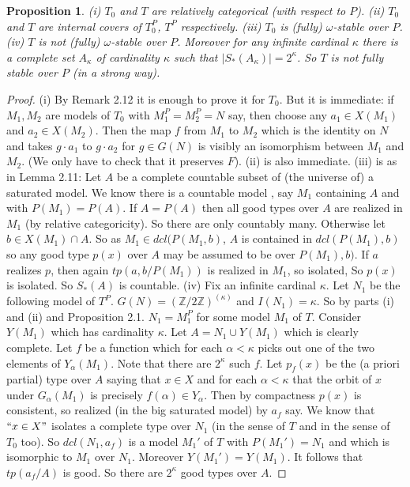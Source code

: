 \documentclass[12pt]{article}
\newtheorem{Proposition}[Theorem]{Proposition}
\newcommand{\Z}{\mathbb Z}  \newcommand{\Zz}{\mathbb Z}
\begin{document}
\begin{Proposition} (i) $T_{0}$ and $T$ are relatively categorical (with respect to $P$).
\newline
(ii) $T_{0}$ and $T$ are internal covers of $T_{0}^{P}$, $T^{P}$ respectively.
\newline
(iii) $T_{0}$ is (fully) $\omega$-stable over $P$.
\newline
(iv) $T$ is not (fully) $\omega$-stable over $P$. Moreover for any infinite cardinal $\kappa$ there is a complete set $A_{\kappa}$ of cardinality $\kappa$ such that  $|S_{*}(A_{\kappa})| = 2^{\kappa}$.  So $T$ is not fully stable over $P$ (in a strong way).  
\end{Proposition} 
\begin{proof} (i) By Remark 2.12 it is enough  to prove it for $T_{0}$. But it is immediate: if $M_{1}, M_{2}$ are models of $T_{0}$ with $M_{1}^{P} = M_{2}^{P} = N$ say, then choose any $a_{1}\in X(M_{1})$ and $a_{2}\in X(M_{2})$. Then 
the map $f$ from $M_{1}$ to $M_{2}$ which is the identity on $N$ and takes $g\cdot a_{1}$ to $g\cdot a_{2}$ for $g\in G(N)$ is visibly an isomorphism between $M_{1}$ and $M_{2}$.  (We only have to check that it preserves $F$). 
\newline
(ii) is also immediate.
\newline
(iii) is as in Lemma 2.11:   Let $A$ be a complete countable subset of (the universe of) a saturated model. We know there is a countable model , say $M_{1}$ containing $A$ and with $P(M_{1}) = P(A)$.  If $A = P(A)$ then all good types 
over $A$ are realized in $M_{1}$ (by relative categoricity). So there are only countably many.  Otherwise let $b\in X(M_{1})\cap A$.  So as $M_{1}\in dcl(P(M_{1},b)$, $A$ is contained in $dcl(P(M_{1}), b)$ so any good type $p(x)$ over $A$ 
may be assumed to be over $P(M_{1}), b)$.  If $a$ realizes $p$, then again $tp(a,b/P(M_{1}))$ is  realized in $M_{1}$, so isolated, So $p(x)$ is isolated. So $S_{*}(A)$ is countable.
\newline
(iv)   Fix an infinite cardinal $\kappa$.  Let $N_{1}$ be the following model of $T^{P}$. $G(N) = (\Z/2\Z)^{(\kappa)}$ and $I(N_{1}) = \kappa$. So by parts (i) and (ii) and Proposition 2.1. $N_{1} = M_{1}^{P}$ for some model $M_{1}$ of $T$.  Consider $Y(M_{1})$  which has cardinality $\kappa$.  Let $A = N_{1}\cup Y(M_{1})$ which is clearly complete. Let $f$ be a function which for each $\alpha< \kappa$ picks out one of the two elements of $Y_{\alpha}(M_{1})$. Note that there are $2^{\kappa}$ such $f$.
Let $p_{f}(x)$ be  the (a priori partial) type over $A$ saying that $x\in X$ and for each $\alpha<\kappa$ that the orbit of $x$ under $G_{\alpha}(M_{1})$ is precisely $f(\alpha) \in Y_{\alpha}$. 
Then by compactness $p(x)$ is consistent, so realized (in the big saturated model) by $a_{f}$ say.  We know that $``x\in X"$ isolates a complete type over $N_{1}$ (in the sense of $T$ and in the sense of $T_{0}$ too).  So $dcl(N_{1},a_{f})$ is a model $M_{1}'$ of $T$ with $P(M_{1}') = N_{1}$ and which is isomorphic to $M_{1}$ over $N_{1}$.  Moreover $Y(M_{1}') = Y(M_{1})$. It follows that $tp(a_{f}/A)$ is good.  So there are $2^{\kappa}$ good types over $A$.


\end{proof} 
\end{document}
